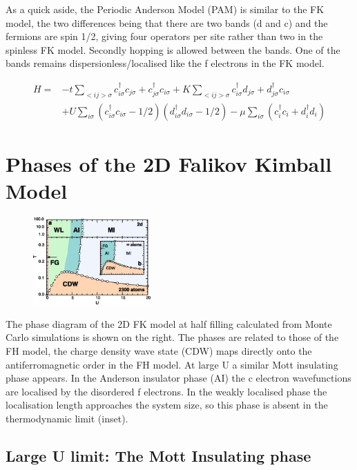 \documentclass[a4paper, 11pt, onecolumn]{article}
\begin{document}
As a quick aside, the Periodic Anderson Model (PAM) is similar to the FK model, the two differences being that there are two bands (d and c) and the fermions are spin 1/2, giving four operators per site rather than two in the spinless FK model. Secondly hopping is allowed between the bands. One of the bands remains dispersionless/localised like the f electrons in the FK model.

\begin{align*} H = &- t\sum_{<ij>\sigma} c^\dagger_{i\sigma} c_{j\sigma} + c^\dagger_{j\sigma} c_{i\sigma} + K\sum_{<ij>\sigma} c^\dagger_{i\sigma} d_{j\sigma} + d^\dagger_{j\sigma} c_{i\sigma} \\
&+ U \sum_{i\sigma} (c^\dagger_ {i\sigma} c_{i\sigma} - 1/2)(d^\dagger_ {i\sigma} d_{i\sigma} - 1/2) - \mu \sum_{i\sigma} (c^\dagger_ i c_i  + d^\dagger_ i d_i)
\end{align*}


\section{Phases of the 2D Falikov Kimball Model}

\begin{figure}
  \centering
    \includegraphics[width=0.4\textwidth]{phase_diagram}
\end{figure}

The phase diagram of the 2D FK model at half filling calculated from Monte Carlo simulations \cite{antipov_interaction-tuned_2016} is shown on the right. The phases are related to those of the FH model, the charge density wave state (CDW) maps directly onto the antiferromagnetic order in the FH model. At large U a similar Mott insulating phase appears. In the Anderson insulator phase (AI) the c electron wavefunctions are localised by the disordered f electrons. In the weakly localised phase the localisation length approaches the system size, so this phase is absent in the thermodynamic limit (inset). 



\subsection{Large U limit: The Mott Insulating phase}
\end{document}
